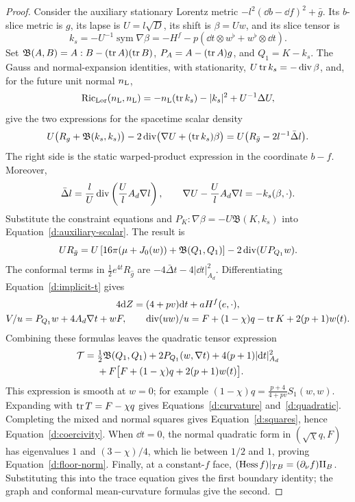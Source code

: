 \begin{proof}
Consider the auxiliary stationary Lorentz metric
$-l^2(\dd b-\dd f)^2+\bar g$.  Its $b$-slice metric is $g$, its
lapse is $U=l\sqrt D$, its shift is $\beta=Uw$, and its slice tensor is
\[
 k_s=-U^{-1}\operatorname{sym}\nabla\beta
     =-H^f-p(\dd t\otimes w^\flat+w^\flat\otimes\dd t).
\]
Set $\mathfrak B(A,B)=A:B-(\operatorname{tr} A)(\operatorname{tr} B)$,
$P_A=A-(\operatorname{tr} A)g$, and $Q_1=K-k_s$.  The Gauss and normal-expansion
identities, with stationarity, $U\operatorname{tr} k_s=-\operatorname{div}\beta$, and, for the
future unit normal $n_{\rm L}$,
\[
 \operatorname{Ric}_{\rm Lor}(n_{\rm L},n_{\rm L})
 =-n_{\rm L}(\operatorname{tr} k_s)-|k_s|^2+U^{-1}\Delta U,
\]
give the two expressions for the spacetime scalar density
\begin{equation}\label{d:auxiliary-scalar}
 U\bigl(R_g+\mathfrak B(k_s,k_s)\bigr)
 -2\operatorname{div}\bigl(\nabla U+(\operatorname{tr} k_s)\beta\bigr)
   =U\bigl(R_{\bar g}-2l^{-1}\bar\Delta l\bigr).
\end{equation}
The right side is the static warped-product expression in the
coordinate $b-f$.  Moreover,
\[
 \bar\Delta l=\frac lU\operatorname{div}\left(\frac UlA_d\nabla l\right),\qquad
 \nabla U-\frac UlA_d\nabla l=-k_s(\beta,\cdot).
\]
Substitute the constraint equations and
$P_K:\nabla\beta=-U\mathfrak B(K,k_s)$ into
Equation~\eqref{d:auxiliary-scalar}.  The result is
\begin{equation}\label{d:graph-scalar}
 UR_{\bar g}
 =U\left[16\pi(\mu+J_0(w))+\mathfrak B(Q_1,Q_1)\right]
       -2\operatorname{div}(UP_{Q_1}w).
\end{equation}
The conformal terms in $\frac12e^{4t}R_{\hat g}$ are
$-4\bar\Delta t-4|\dd t|_{A_d}^2$.  Differentiating
Equation~\eqref{d:implicit-t} gives
\begin{gather}\label{d:z-differential}
 4\mathrm d Z=(4+pv)\mathrm d t+aH^f(e,\cdot),\\
 V/u=P_{Q_1}w+4A_d\nabla t+wF,\qquad
 \operatorname{div}(uw)/u=F+(1-\chi)q-\operatorname{tr} K+2(p+1)w(t).
 \label{d:flux-conversion}
\end{gather}
Combining these formulas leaves the quadratic tensor expression
\begin{align}\label{d:quadratic-tensor}
 \mathcal T={}&\tfrac12\mathfrak B(Q_1,Q_1)
   +2P_{Q_1}(w,\nabla t)+4(p+1)|\mathrm d t|_{A_d}^2\notag\\
 &+F\bigl[F+(1-\chi)q+2(p+1)w(t)\bigr].
\end{align}
This expression is smooth at $w=0$; for example
$(1-\chi)q=\frac{p+4}{4+pv}S_1(w,w)$.
Expanding with $\operatorname{tr} T=F-\chi q$ gives
Equations~\eqref{d:curvature} and~\eqref{d:quadratic}.  Completing the
mixed and normal squares gives Equation~\eqref{d:squares}, hence
Equation~\eqref{d:coercivity}.  When $\dd t=0$, the normal quadratic
form in $(\sqrt\chi q,F)$ has eigenvalues $1$ and $(3-\chi)/4$,
which lie between $1/2$ and $1$, proving
Equation~\eqref{d:floor-norm}.  Finally, at a constant-$f$ face,
$(\operatorname{Hess} f)|_{TB}=(\partial_\nu f)\mathrm{II}_B$.  Substituting
this into the trace equation gives the first boundary identity;
the graph and conformal mean-curvature formulas give the second.
\end{proof}

